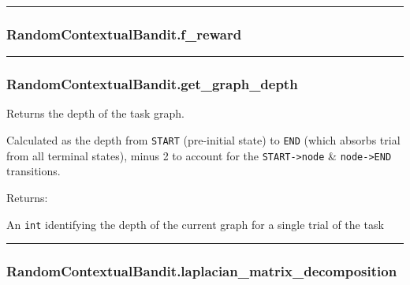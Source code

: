 \begin{center}\rule{0.5\linewidth}{\linethickness}\end{center}

\subsubsection{RandomContextualBandit.f\_reward}\label{randomcontextualbandit.f_reward}

\begin{Shaded}
\begin{Highlighting}[]
\end{Highlighting}
\end{Shaded}

\begin{center}\rule{0.5\linewidth}{\linethickness}\end{center}

\subsubsection{RandomContextualBandit.get\_graph\_depth}\label{randomcontextualbandit.get_graph_depth}

\begin{Shaded}
\begin{Highlighting}[]
\NormalTok{)}
\end{Highlighting}
\end{Shaded}

Returns the depth of the task graph.

Calculated as the depth from \texttt{START} (pre-initial state) to
\texttt{END} (which absorbs trial from all terminal states), minus 2 to
account for the \texttt{START-\textgreater{}node} \&
\texttt{node-\textgreater{}END} transitions.

Returns:

An \texttt{int} identifying the depth of the current graph for a single
trial of the task

\begin{center}\rule{0.5\linewidth}{\linethickness}\end{center}

\subsubsection{RandomContextualBandit.laplacian\_matrix\_decomposition}\label{randomcontextualbandit.laplacian_matrix_decomposition}

